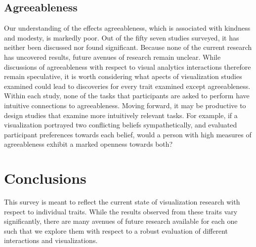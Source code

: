 \documentclass[conference]{IEEEtran}
\begin{document}
\subsection{Agreeableness}\label{Agreeableness}
Our understanding of the effects agreeableness, which is associated with kindness and modesty,
is markedly poor. Out of the fifty seven studies surveyed, it has neither been discussed nor
found significant. Because none of the current research has uncovered results, future
avenues of research remain unclear. While discussions of agreeableness with respect to
visual analytics interactions therefore remain speculative, it is worth considering what
apects of visualization studies examined could lead to discoveries for every trait examined
except agreeableness. Within each study, none of the tasks that participants are asked to
perform have intuitive connections to agreeableness. Moving forward, it may be productive to
design studies that examine more intuitively relevant tasks. For example, if a visualization
portrayed two conflicting beliefs sympathetically, and evaluated participant preferences
towards each belief, would a person with high measures of agreeableness exhibit a marked
openness towards both?

\section{Conclusions}
This survey is meant to reflect the current state of visualization research with respect
to individual traits. While the results observed from these traits vary significantly, there
are many avenues of future research available for each one such that we explore them with
respect to a robust evaluation of different interactions and visualizations.

\pagebreak


\vspace{12pt}
\end{document}
